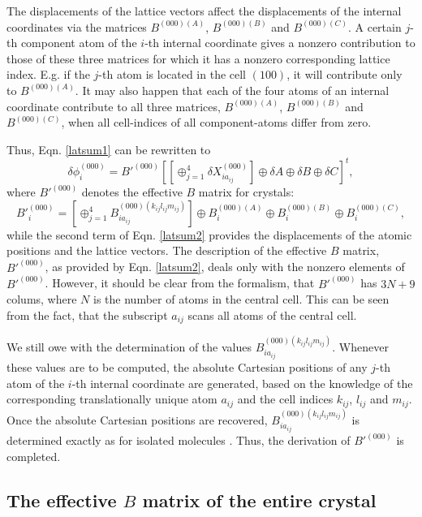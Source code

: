 \documentclass[prl,aps,preprint,superbib,12pt]{revtex4}
\begin{document}
The displacements of the lattice vectors affect the displacements
of the internal coordinates via the matrices 
$B^{(000)(A)}$, $B^{(000)(B)}$ and $B^{(000)(C)}$.
A certain $j$-th component atom of the $i$-th internal
coordinate gives a nonzero contribution to those of these three
matrices for which it has a nonzero corresponding lattice index.
E.g. if the $j$-th atom is located in the cell $(100)$,
it will contribute only to $B^{(000)(A)}$. It may also happen that
each of the four atoms of an internal coordinate contribute
to all three matrices, $B^{(000)(A)}$, $B^{(000)(B)}$ and $B^{(000)(C)}$,
when all cell-indices of all component-atoms differ from zero.

Thus, Eqn. \ref{latsum1} can be rewritten to
\begin{equation} \label{latsum2}
\delta \phi^{(000)}_{i} = 
B'^{(000)}
\left[
[\oplus_{j=1}^{4} \delta X^{(000)}_{ia_{ij}} ] 
\oplus \delta A 
\oplus \delta B 
\oplus \delta C 
\right]^{t} ,
\end{equation}
where $B'^{(000)}$ denotes the effective $B$ matrix for crystals:
\begin{equation} \label{latsum3}
B'^{(000)}_{i} =
[\oplus_{j=1}^{4}
B^{(000)(k_{ij}l_{ij}m_{ij})}_{ia_{ij}}
] \oplus B^{(000)(A)}_{i} \oplus B^{(000)(B)}_{i} \oplus B^{(000)(C)}_{i} ,
\end{equation}
while the second term of Eqn. \ref{latsum2} 
provides the displacements of the atomic positions
and the lattice vectors.
The description of the effective $B$ matrix, $B'^{(000)}$, 
as provided by Eqn. \ref{latsum2}, deals only with the
nonzero elements of $B'^{(000)}$. However, it should be clear from the
formalism, that
$B'^{(000)}$ has $3N+9$ colums, where $N$ is the number of atoms
in the central cell. This can be seen from the fact, that the subscript 
$a_{ij}$ scans all atoms of the central cell.

We still owe with the determination 
of the values $B^{(000)(k_{ij}l_{ij}m_{ij})}_{ia_{ij}}$.
Whenever these values are to be computed, the absolute Cartesian positions
of any $j$-th atom of the $i$-th internal coordinate are generated, based
on the knowledge of the corresponding translationally unique atom $a_{ij}$
and the cell indices $k_{ij}$, $l_{ij}$ and $m_{ij}$. Once the absolute
Cartesian positions are recovered, $B^{(000)(k_{ij}l_{ij}m_{ij})}_{ia_{ij}}$
is determined exactly as for isolated molecules \cite{EWilson55}. Thus,
the derivation of $B'^{(000)}$ is completed.

\subsection{The effective $B$ matrix of the entire crystal}
\end{document}
